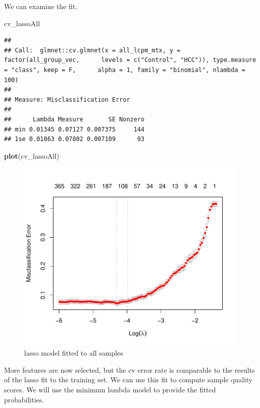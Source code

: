\documentclass[
]{book}
\newenvironment{Shaded}{\begin{snugshade}}{\end{snugshade}}
\newcommand{\KeywordTok}[1]{\textcolor[rgb]{0.13,0.29,0.53}{\textbf{#1}}}
\newcommand{\NormalTok}[1]{#1}
\begin{document}
We can examine the fit.

\begin{Shaded}
\begin{Highlighting}[]
\NormalTok{cv\_lassoAll}
\end{Highlighting}
\end{Shaded}

\begin{verbatim}
## 
## Call:  glmnet::cv.glmnet(x = all_lcpm_mtx, y = factor(all_group_vec,      levels = c("Control", "HCC")), type.measure = "class", keep = F,      alpha = 1, family = "binomial", nlambda = 100) 
## 
## Measure: Misclassification Error 
## 
##      Lambda Measure       SE Nonzero
## min 0.01345 0.07127 0.007375     144
## 1se 0.01863 0.07802 0.007109      93
\end{verbatim}

\begin{Shaded}
\begin{Highlighting}[]
\KeywordTok{plot}\NormalTok{(cv\_lassoAll)}
\end{Highlighting}
\end{Shaded}

\begin{figure}
\centering
\includegraphics{Static/figures/plot-lassoAll-1.pdf}
\caption{\label{fig:plot-lassoAll}lasso model fitted to all samples}
\end{figure}

More features are now selected, but the cv error rate is comparable to the results
of the lasso fit to the training set. We can use this fit to compute sample
quality scores. We will use the minimum lambda model to provide
the fitted probabilities.
\end{document}
